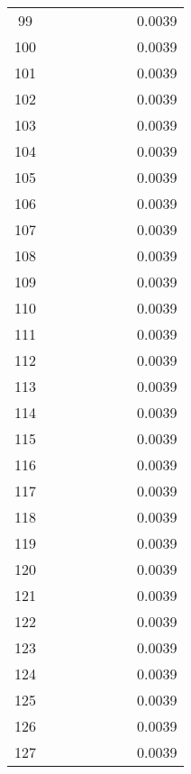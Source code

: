 \documentclass[12pt]{article}
\begin{document}
\begin{center}
\begin{longtable}{|c|c|c|c|c|c|c|c|}
                    99 &  &  &  &  &  &  & 0.0039 \\
                    100 &  &  &  &  &  &  & 0.0039 \\
                    101 &  &  &  &  &  &  & 0.0039 \\
                    102 &  &  &  &  &  &  & 0.0039 \\
                    103 &  &  &  &  &  &  & 0.0039 \\
                    104 &  &  &  &  &  &  & 0.0039 \\
                    105 &  &  &  &  &  &  & 0.0039 \\
                    106 &  &  &  &  &  &  & 0.0039 \\
                    107 &  &  &  &  &  &  & 0.0039 \\
                    108 &  &  &  &  &  &  & 0.0039 \\
                    109 &  &  &  &  &  &  & 0.0039 \\
                    110 &  &  &  &  &  &  & 0.0039 \\
                    111 &  &  &  &  &  &  & 0.0039 \\
                    112 &  &  &  &  &  &  & 0.0039 \\
                    113 &  &  &  &  &  &  & 0.0039 \\
                    114 &  &  &  &  &  &  & 0.0039 \\
                    115 &  &  &  &  &  &  & 0.0039 \\
                    116 &  &  &  &  &  &  & 0.0039 \\
                    117 &  &  &  &  &  &  & 0.0039 \\
                    118 &  &  &  &  &  &  & 0.0039 \\
                    119 &  &  &  &  &  &  & 0.0039 \\
                    120 &  &  &  &  &  &  & 0.0039 \\
                    121 &  &  &  &  &  &  & 0.0039 \\
                    122 &  &  &  &  &  &  & 0.0039 \\
                    123 &  &  &  &  &  &  & 0.0039 \\
                    124 &  &  &  &  &  &  & 0.0039 \\
                    125 &  &  &  &  &  &  & 0.0039 \\
                    126 &  &  &  &  &  &  & 0.0039 \\
                    127 &  &  &  &  &  &  & 0.0039 \\
                    \hline
                \end{longtable}
            \end{center}
\end{document}
